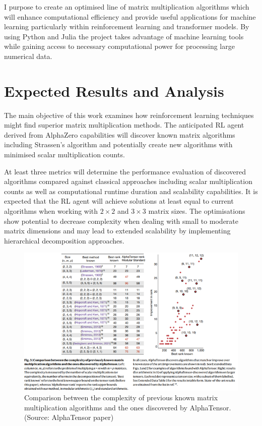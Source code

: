 \documentclass{article}
\begin{document}
I purpose to create an optimised line of matrix multiplication algorithms which will enhance computational efficiency and provide useful applications for machine learning particularly within reinforcement learning and transformer models. By using Python and Julia the project takes advantage of machine learning tools while gaining access to necessary computational power for processing large numerical data.

\section{Expected Results and Analysis}
The main objective of this work examines how reinforcement learning techniques might find superior matrix multiplication methods. The anticipated RL agent derived from AlphaZero capabilities will discover known matrix algorithms including Strassen's algorithm and potentially create new algorithms with minimised scalar multiplication counts.

At least three metrics will determine the performance evaluation of discovered algorithms compared against classical approaches including scalar multiplication counts as well as computational runtime duration and scalability capabilities. It is expected that the RL agent will achieve solutions at least equal to current algorithms when working with \( 2 \times 2 \) and \( 3 \times 3 \) matrix sizes. The optimisations show potential to decrease complexity when dealing with small to moderate matrix dimensions and may lead to extended scalability by implementing hierarchical decomposition approaches.

\begin{figure}[H]
    \centering
    \includegraphics[width=0.6\linewidth]{Picture4.png}
    \caption{Comparison between the complexity of previous known matrix multiplication algorithms and the ones discovered by AlphaTensor. (Source: AlphaTensor paper)}
    \label{fig:comparison-alphatensor}
\end{figure}
\end{document}
